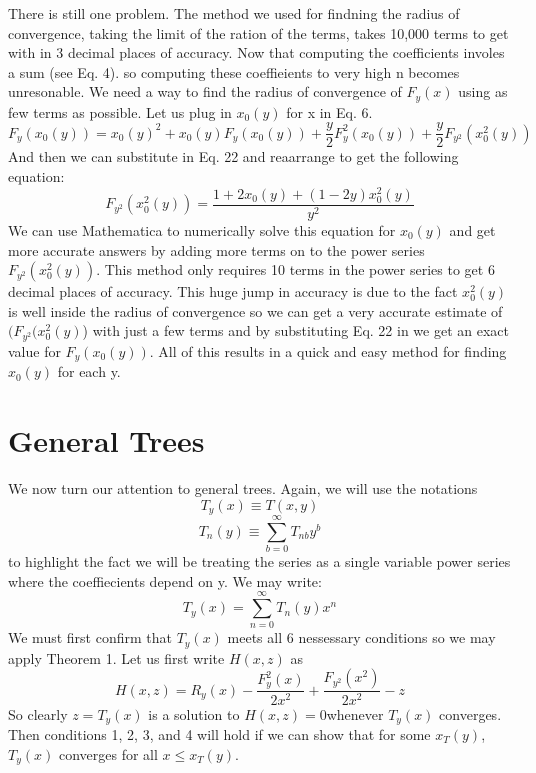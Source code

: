 \documentclass{article}
\begin{document}
There is still one problem. The method we used for findning the radius of convergence, taking the limit of the ration of the terms, takes 10,000 terms to get with in 3 decimal places of accuracy. Now that computing the coefficients involes a sum (see Eq. 4). so computing these coeffieients to very high n becomes unresonable. We need a way to find the radius of convergence of \(F_y(x)\) using as few terms as possible. Let us plug in \(x_0(y)\) for x in Eq. 6.
\[F_y(x_0(y))=x_0(y)^2+x_0(y)F_y(x_0(y))+\frac{y}{2}F_y^2(x_0(y))+\frac{y}{2}F_{y^2}(x_0^2(y))\]
And then we can substitute in Eq. 22 and reaarrange to get the following equation:
\begin{equation}
F_{y^2}(x_0^2(y))=\frac{1+2x_0(y)+(1-2y)x_0^2(y)}{y^2}
\end{equation}
We can use Mathematica to numerically solve this equation for \(x_0(y)\) and get more accurate answers by adding more terms on to the power series \(F_{y^2}(x_0^2(y))\). This method only requires 10 terms in the power series to get 6 decimal places of accuracy. This huge jump in accuracy is due to the fact \(x_0^2(y)\) is well inside the radius of convergence so we can get a very accurate estimate of \((F_{y^2}(x_0^2(y)\)) with just a few terms and by substituting Eq. 22 in we get an exact value for \(F_y(x_0(y))\). All of this results in a quick and easy method for finding \(x_0(y)\) for each y.

\section{General Trees} 
We now turn our attention to general trees. Again, we will use the notations
\begin{equation}
T_y(x)\equiv T(x,y) 
\end{equation}
\begin{equation}
T_n(y) \equiv \sum_{b=0}^\infty T_{nb}y^b
\end{equation}
to highlight the fact we will be treating the series as a single variable power series where the coeffiecients depend on y. We may write:
\begin{equation}
T_y(x) = \sum_{n=0}^\infty T_n(y)x^n
\end{equation}
 We must first confirm that \(T_y(x)\) meets all 6 nessessary conditions so we may apply Theorem 1. Let us first write \(H(x,z)\) as
\begin{equation}
H(x,z)=R_y(x)-\frac{F_y^2(x)}{2x^2}+\frac{F_{y^2}(x^2)}{2x^2}-z
\end{equation}
So clearly \(z=T_y(x)\) is a solution to \(H(x,z)=0\)whenever \(T_y(x)\) converges. Then conditions 1, 2, 3, and 4 will hold if we can show that for some \(x_T(y)\),\(T_y(x)\) converges for all \(x\leq x_T(y)\). 
\end{document}
